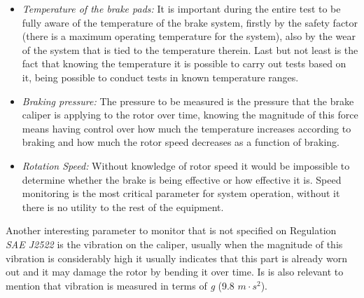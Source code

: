 			\begin{itemize}
				\item \textit{Temperature of the brake pads:} It is important during the entire test to be fully aware of the temperature of the brake system, firstly by the safety factor (there is a maximum operating temperature for the system), also by the wear of the system that is tied to the temperature therein. Last but not least is the fact that knowing the temperature it is possible to carry out tests based on it, being possible to conduct tests in known temperature ranges.\label{itm:monitored-temperature}
				\item \textit{Braking pressure:} The pressure to be measured is the pressure that the brake caliper is applying to the rotor over time, knowing the magnitude of this force means having control over how much the temperature increases according to braking and how much the rotor speed decreases as a function of braking.\label{itm:monitored-pressure}
				\item \textit{Rotation Speed:} Without knowledge of rotor speed it would be impossible to determine whether the brake is being effective or how effective it is. Speed monitoring is the most critical parameter for system operation, without it there is no utility to the rest of the equipment. \label{itm:monitored-speed}
			\end{itemize}

			Another interesting parameter to monitor that is not specified on Regulation \textit{SAE J2522} is the vibration on the caliper, usually when the magnitude of this vibration is considerably high it usually indicates that this part is already worn out \cite{goodyear-calipers} and it may damage the rotor by bending it over time. Is is also relevant to mention that vibration is measured in terms of \textit{g} (9.8 $m\cdot s^2$).